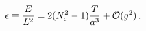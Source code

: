 \begin{equation}
\epsilon \equiv \frac{E}{L^2} = 
2(N_\mathrm{c}^2-1) \frac{T}{a^3} + {\cal O}(g^2) \, . 
\label{eq35}
\end{equation}

